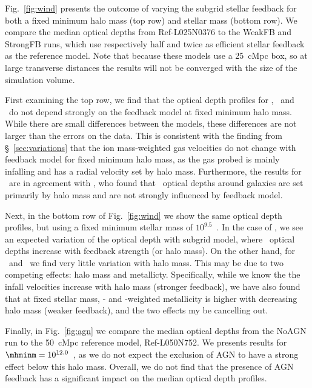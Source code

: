 \documentclass[useAMS,usenatbib,letterpaper]{mn2e}
\begin{document}
Fig.~\ref{fig:wind} presents the outcome of varying the subgrid
stellar feedback for both a fixed minimum halo mass (top row) and stellar mass (bottom row).
We compare the median optical depths from
 Ref-L025N0376 to the WeakFB and StrongFB runs, which use respectively half
and twice as efficient stellar feedback as the reference model. Note that 
because these models use a 25~cMpc box, so at large transverse distances the 
results will not be converged with the size of the simulation volume. 

First examining the top row, we find that the optical depth profiles for \hone,
\cfour\ and \sifour\ do not depend strongly on the feedback model at fixed minimum halo mass.
While there are small differences between the models, these differences are not larger than
the errors on the data. 
This is consistent with the finding from \S~\ref{sec:variations} that the ion mass-weighted gas velocities 
do not change with feedback model for fixed minimum halo mass, as the gas probed is mainly infalling 
and has a radial velocity set by halo mass. 
Furthermore, the results for \hone\ are in agreement with \citet{rakic13}, who found that \hone\ optical depths around 
galaxies are set primarily by halo mass and are not strongly influenced by feedback model. 

Next, in the bottom row of Fig.~\ref{fig:wind} we show the same optical depth profiles, but 
using a fixed minimum stellar mass of $10^{9.5}$~\msol. In the case of \hone, we see an expected 
variation of the optical depth with subgrid model, where \hone\ optical depths increase
with feedback strength (or halo mass). On the other hand, for \cfour\ and \sifour\ we find
very little variation with halo mass. This may be due to two competing effects: halo mass 
and metallicty. Specifically, while we know the the infall velocities increase with halo mass
(stronger feedback), we have also found that at fixed stellar mass, \cfour- and \sifour-weighted
metallicity is higher with decreasing halo mass (weaker feedback), and the two effects my be cancelling out. 

Finally, in Fig.~\ref{fig:agn}  we compare
the median optical depths from the NoAGN run to the 50~cMpc
reference model, Ref-L050N752. We presents results for $\mhminm=10^{12.0}$~\msol,
as we do not expect the exclusion of AGN to have a strong effect below 
this halo mass. Overall, we do not find that the presence of AGN feedback has a
significant impact on the median optical depth profiles. 
\end{document}
